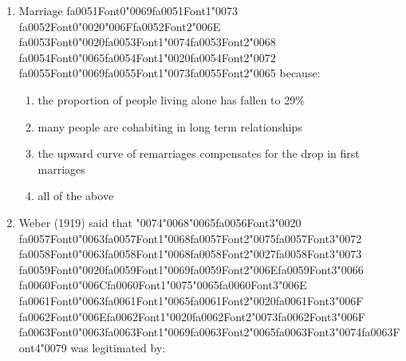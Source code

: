\documentclass[12pt]{article}
\begin{document}
\begin{enumerate}[label=\arabic*.]
\begin{enumerate}[label=(\alph*)]
    \item the United Nations has refused to call on rich countries to provide it
    \item debt repayments with interest can be greater than the amount of money received
    \item debt repayments with interest can be greater than the amount of money received
\end{enumerate}
\item Marriage {\csname fa0051Font0\endcsname\char"0069}{\csname fa0051Font1\endcsname\char"0073} {\csname fa0052Font0\endcsname\char"0020}{\char"006F}{\csname fa0052Font2\endcsname\char"006E} {\csname fa0053Font0\endcsname\char"0020}{\csname fa0053Font1\endcsname\char"0074}{\csname fa0053Font2\endcsname\char"0068} {\csname fa0054Font0\endcsname\char"0065}{\csname fa0054Font1\endcsname\char"0020}{\csname fa0054Font2\endcsname\char"0072} {\csname fa0055Font0\endcsname\char"0069}{\csname fa0055Font1\endcsname\char"0073}{\csname fa0055Font2\endcsname\char"0065} because:
\begin{enumerate}[label=(\alph*)]
    \item the proportion of people living alone has fallen to 29\%
    \item many people are cohabiting in long term relationships
    \item the upward curve of remarriages compensates for the drop in first marriages
    \item all of the above
\end{enumerate}
\item Weber (1919) said that {\char"0074}{\char"0068}{\char"0065}{\csname fa0056Font3\endcsname\char"0020} {\csname fa0057Font0\endcsname\char"0063}{\csname fa0057Font1\endcsname\char"0068}{\csname fa0057Font2\endcsname\char"0075}{\csname fa0057Font3\endcsname\char"0072} {\csname fa0058Font0\endcsname\char"0063}{\csname fa0058Font1\endcsname\char"0068}{\csname fa0058Font2\endcsname\char"0027}{\csname fa0058Font3\endcsname\char"0073} {\csname fa0059Font0\endcsname\char"0020}{\csname fa0059Font1\endcsname\char"0069}{\csname fa0059Font2\endcsname\char"006E}{\csname fa0059Font3\endcsname\char"0066} {\csname fa0060Font0\endcsname\char"006C}{\csname fa0060Font1\endcsname\char"0075}{\char"0065}{\csname fa0060Font3\endcsname\char"006E} {\csname fa0061Font0\endcsname\char"0063}{\csname fa0061Font1\endcsname\char"0065}{\csname fa0061Font2\endcsname\char"0020}{\csname fa0061Font3\endcsname\char"006F} {\csname fa0062Font0\endcsname\char"006E}{\csname fa0062Font1\endcsname\char"0020}{\csname fa0062Font2\endcsname\char"0073}{\csname fa0062Font3\endcsname\char"006F} {\csname fa0063Font0\endcsname\char"0063}{\csname fa0063Font1\endcsname\char"0069}{\csname fa0063Font2\endcsname\char"0065}{\csname fa0063Font3\endcsname\char"0074}{\csname fa0063Font4\endcsname\char"0079} was legitimated by:

\end{enumerate}
\end{document}

